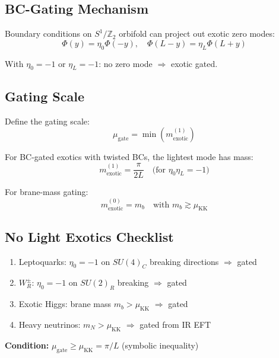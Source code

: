 \documentclass[11pt,a4paper]{article}
\begin{document}
\subsection{BC-Gating Mechanism}
\label{subsec:bc-gating}

Boundary conditions on $S^1/\mathbb{Z}_2$ orbifold can project out exotic zero modes:
\begin{equation}
\label{eq:bc-projection}
\Phi(y) = \eta_0 \Phi(-y), \quad \Phi(L-y) = \eta_L \Phi(L+y)
\end{equation}

With $\eta_0 = -1$ or $\eta_L = -1$: no zero mode $\Rightarrow$ exotic gated.

\subsection{Gating Scale}
\label{subsec:gating-scale}

Define the gating scale:
\begin{equation}
\label{eq:mu-gate-def}
\mu_{\text{gate}} = \min\left(m_{\text{exotic}}^{(1)}\right)
\end{equation}

For BC-gated exotics with twisted BCs, the lightest mode has mass:
\begin{equation}
\label{eq:exotic-mass}
m_{\text{exotic}}^{(1)} = \frac{\pi}{2L} \quad \text{(for } \eta_0 \eta_L = -1 \text{)}
\end{equation}

For brane-mass gating:
\begin{equation}
\label{eq:brane-mass-gating}
m_{\text{exotic}}^{(0)} = m_b \quad \text{with } m_b \gtrsim \mu_{\text{KK}}
\end{equation}

\subsection{No Light Exotics Checklist}
\label{subsec:checklist}

\begin{tcolorbox}[colback=cyan!5!white,colframe=cyan!60!black,title=\textbf{EXOTICS GATING CHECKLIST}]
\begin{enumerate}
\item[\checkmark] Leptoquarks: $\eta_0 = -1$ on $SU(4)_C$ breaking directions $\Rightarrow$ gated
\item[\checkmark] $W_R^\pm$: $\eta_0 = -1$ on $SU(2)_R$ breaking $\Rightarrow$ gated
\item[\checkmark] Exotic Higgs: brane mass $m_b > \mu_{\text{KK}}$ $\Rightarrow$ gated
\item[\checkmark] Heavy neutrinos: $m_N > \mu_{\text{KK}}$ $\Rightarrow$ gated from IR EFT
\end{enumerate}

\textbf{Condition:} $\mu_{\text{gate}} \geq \mu_{\text{KK}} = \pi/L$ (symbolic inequality)
\end{tcolorbox}
\end{document}
